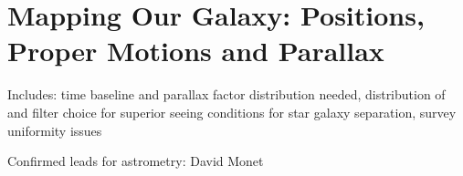 \chapter[Astrometry]{Mapping Our Galaxy: Positions, Proper Motions and Parallax}

Includes: time baseline and parallax factor distribution needed,
distribution of and filter choice for superior seeing conditions for
star galaxy separation, survey uniformity issues

Confirmed leads for astrometry: David Monet

